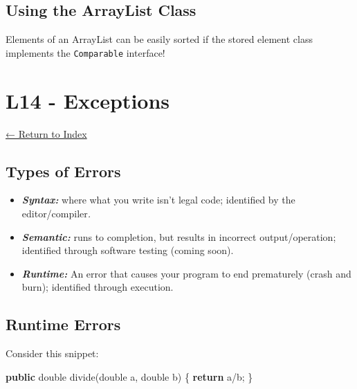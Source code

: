 \documentclass[]{article}
\newenvironment{Shaded}{}{}
\newcommand{\DataTypeTok}[1]{\textcolor[rgb]{0.56,0.13,0.00}{#1}}
\newcommand{\FunctionTok}[1]{\textcolor[rgb]{0.02,0.16,0.49}{#1}}
\newcommand{\KeywordTok}[1]{\textcolor[rgb]{0.00,0.44,0.13}{\textbf{#1}}}
\newcommand{\NormalTok}[1]{#1}
\begin{document}
\hypertarget{using-the-arraylist-class}{%
\subsection{Using the ArrayList Class}\label{using-the-arraylist-class}}

Elements of an ArrayList can be easily sorted if the stored element
class implements the \texttt{Comparable} interface!

\hypertarget{l14---exceptions}{%
\section{L14 - Exceptions}\label{l14---exceptions}}

\protect\hyperlink{table-of-contents}{← Return to Index}

\hypertarget{types-of-errors}{%
\subsection{Types of Errors}\label{types-of-errors}}

\begin{itemize}
\item
  \textbf{\emph{Syntax:}} where what you write isn't legal code;
  identified by the editor/compiler\emph{.}
\item
  \textbf{\emph{Semantic:}} runs to completion, but results in incorrect
  output/operation; identified through software testing (coming soon).
\item
  \textbf{\emph{Runtime:}} An error that causes your program to end
  prematurely (crash and burn); identified through execution.
\end{itemize}

\hypertarget{runtime-errors}{%
\subsection{Runtime Errors}\label{runtime-errors}}

Consider this snippet:

\begin{Shaded}
\begin{Highlighting}[]
\KeywordTok{public} \DataTypeTok{double} \FunctionTok{divide}\NormalTok{(}\DataTypeTok{double}\NormalTok{ a, }\DataTypeTok{double}\NormalTok{ b) \{}
    \KeywordTok{return}\NormalTok{ a/b;}
\NormalTok{\}}
\end{Highlighting}
\end{Shaded}
\end{document}
